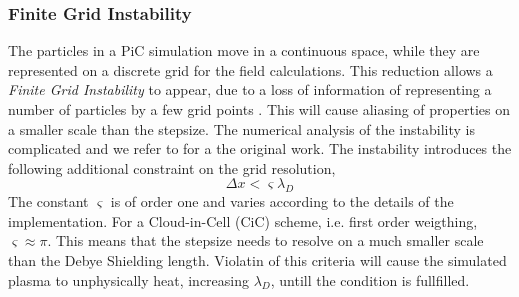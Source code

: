     \subsubsection{Finite Grid Instability}
        \label{sec:finite_grid_instability}
        The particles in a PiC simulation move in a continuous space, while they are
        represented on a discrete grid for the field calculations. This reduction allows
        a \textit{Finite Grid Instability} to appear, due to a loss of information of representing a number of particles by a few grid points \citep{lapenta_particle_????}.
		This will cause aliasing of properties on a smaller scale than the stepsize.
        The numerical analysis of the instability is complicated and we refer to
        \citet{birdsall_plasma_2004,hockney_computer_1988} for a the original work.
        The instability introduces the following additional constraint on the grid resolution,
        \begin{equation}
            \Delta x < \varsigma \lambda_D
        \end{equation}
        The constant \(\varsigma\) is of order one and varies according to the details of the implementation.
		For a Cloud-in-Cell (CiC) scheme, i.e. first order weigthing, \(\varsigma \approx \pi\).
		This means that the stepsize needs to resolve on a much smaller scale than the
		Debye Shielding length. Violatin of this criteria will cause the simulated plasma
		to unphysically heat, increasing \(\lambda_D\), untill the condition is fullfilled.
